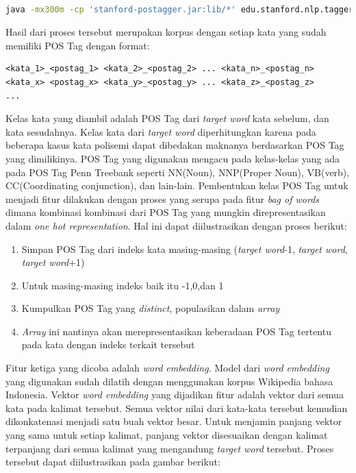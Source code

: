 \begin{lstlisting}[language=bash,caption={Stanford POS Tagger}, label={stanford-pos-tagger}]

java -mx300m -cp 'stanford-postagger.jar:lib/*' edu.stanford.nlp.tagger.maxent.MaxentTagger -model <model_bahasa_indonesia> -textFile <korpus_bahasa_indonesia>

\end{lstlisting}

Hasil dari proses tersebut merupakan korpus dengan setiap kata yang sudah memiliki POS Tag dengan format:

\begin{lstlisting}
<kata_1>_<postag_1> <kata_2>_<postag_2> ... <kata_n>_<postag_n>
<kata_x> <postag_x> <kata_y>_<postag_y> ... <kata_z>_<postag_z>
...
\end{lstlisting}

Kelas kata yang diambil adalah POS Tag dari \textit{target word} kata sebelum, dan kata sesudahnya. Kelas kata dari \textit{target word} diperhitungkan karena pada beberapa kasus kata polisemi dapat dibedakan maknanya berdasarkan POS Tag yang dimilikinya. POS Tag yang digunakan mengacu pada kelas-kelas yang ada pada POS Tag Penn Treebank seperti NN(Noun), NNP(Proper Noun), VB(verb), CC(Coordinating conjunction), dan lain-lain. Pembentukan kelas POS Tag untuk menjadi fitur dilakukan dengan proses yang serupa pada fitur \textit{bag of words} dimana kombinasi kombinasi dari POS Tag yang mungkin direpresentasikan dalam \textit{one hot representation}. Hal ini dapat diilustrasikan dengan proses berikut:

\begin{enumerate}
	\item Simpan POS Tag dari indeks kata masing-masing (\textit{target word}-1, \textit{target word}, \textit{target word}+1)
	\item Untuk masing-masing indeks baik itu -1,0,dan 1
	\item Kumpulkan POS Tag yang \textit{distinct}, populasikan dalam \textit{array}
	\item \textit{Array} ini nantinya akan merepresentasikan keberadaan POS Tag tertentu pada kata dengan indeks terkait tersebut
\end{enumerate}

Fitur ketiga yang dicoba adalah \textit{word embedding}. Model dari \textit{word embedding} yang digunakan sudah dilatih dengan menggunakan korpus Wikipedia bahasa Indonesia. Vektor \textit{word embedding} yang dijadikan fitur adalah vektor dari semua kata pada kalimat tersebut. Semua vektor nilai dari kata-kata tersebut kemudian dikonkatenasi menjadi satu buah vektor besar. Untuk menjamin panjang vektor yang sama untuk setiap kalimat, panjang vektor disesuaikan dengan kalimat terpanjang dari semua kalimat yang mengandung \textit{target word} tersebut. Proses tersebut dapat diilustrasikan pada gambar berikut:

